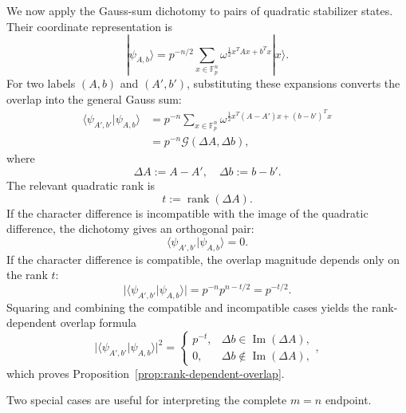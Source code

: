 \documentclass[11pt]{article}
\newcommand{\F}{\mathbb F}
\newcommand{\rank}{\operatorname{rank}}
\newcommand{\im}{\operatorname{Im}}
\newcommand{\1}{\mathbf 1}
\theoremstyle{plain}
\theoremstyle{definition}
\theoremstyle{remark}
\begin{document}
We now apply the Gauss-sum dichotomy to pairs of quadratic stabilizer states.
Their coordinate representation is
\begin{equation}
  |\psi_{A,b}\rangle
  =p^{-n/2}\sum_{x\in\F_p^n}
   \omega^{\frac12x^TAx+b^Tx}|x\rangle.
  \label{eq:appB-state-recall}
\end{equation}
For two labels $(A,b)$ and $(A',b')$, substituting these expansions converts
the overlap into the general Gauss sum:
\begin{align}
  \langle\psi_{A',b'}|\psi_{A,b}\rangle
  &=p^{-n}\sum_{x\in\F_p^n}
    \omega^{\frac12x^T(A-A')x+(b-b')^Tx}                          \\
  &=p^{-n}\mathcal G(\Delta A,\Delta b),
  \label{eq:appB-overlap-as-Gauss-sum}
\end{align}
where
\begin{equation}
  \Delta A:=A-A',
  \quad
  \Delta b:=b-b'.
  \label{eq:appB-overlap-differences}
\end{equation}
The relevant quadratic rank is
\begin{equation}
  t:=\rank(\Delta A).
  \label{eq:appB-overlap-rank}
\end{equation}
If the character difference is incompatible with the image of the quadratic
difference, the dichotomy gives an orthogonal pair:
\begin{equation}
  \langle\psi_{A',b'}|\psi_{A,b}\rangle=0.
  \label{eq:appB-overlap-zero}
\end{equation}
If the character difference is compatible, the overlap magnitude depends only
on the rank $t$:
\begin{equation}
  \lvert\langle\psi_{A',b'}|\psi_{A,b}\rangle\rvert
  =p^{-n}p^{n-t/2}
  =p^{-t/2}.
  \label{eq:appB-overlap-absolute-value}
\end{equation}
Squaring and combining the compatible and incompatible cases yields the
rank-dependent overlap formula
\begin{equation}
  \lvert\langle\psi_{A',b'}|\psi_{A,b}\rangle\rvert^2
  =
  \begin{cases}
    p^{-t},&\Delta b\in\im(\Delta A),\\
    0,&\Delta b\notin\im(\Delta A),
  \end{cases},
  \label{eq:appB-rank-dependent-overlap-final}
\end{equation}
which proves Proposition~\ref{prop:rank-dependent-overlap}.

\label{appsubsec:overlap-special-cases}
Two special cases are useful for interpreting the complete $m=n$ endpoint.
\end{document}
